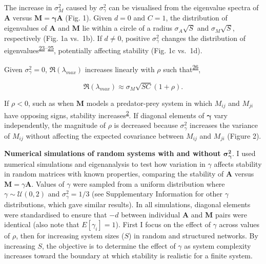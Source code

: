 \documentclass[]{article}
\begin{document}
The increase in \(\sigma^{2}_{M}\) caused by \(\sigma^{2}_\gamma\) can
be visualised from the eigenvalue spectra of \(\textbf{A}\) versus
\(\textbf{M} = \boldsymbol{\gamma}\textbf{A}\) (Fig. 1). Given \(d = 0\)
and \(C = 1\), the distribution of eigenvalues of \(\textbf{A}\) and
\(\textbf{M}\) lie within a circle of a radius \(\sigma_{A}\sqrt{S}\)
and \(\sigma_{M}\sqrt{S}\), respectively (Fig. 1a vs.~1b). If
\(d \neq 0\), positive \(\sigma^{2}_\gamma\) changes the distribution of
eigenvalues\textsuperscript{\protect\hyperlink{ref-Ahmadian2015}{23}--\protect\hyperlink{ref-Stone2017}{25}},
potentially affecting stability (Fig. 1c vs.~1d).

Given \(\sigma^{2}_\gamma = 0\), \(\Re(\lambda_{max})\) increases
linearly with \(\rho\) such
that\textsuperscript{\protect\hyperlink{ref-Tang2014c}{26}},

\begin{equation} 
\Re(\lambda_{max}) \approx \sigma_{M}\sqrt{SC}\left(1 + \rho\right). \nonumber
\end{equation}

If \(\rho < 0\), such as when \(\textbf{M}\) models a predator-prey
system in which \(M_{ij}\) and \(M_{ji}\) have opposing signs, stability
increases\textsuperscript{\protect\hyperlink{ref-Allesina2012}{2}}. If
diagonal elements of \(\boldsymbol{\gamma}\) vary independently, the
magnitude of \(\rho\) is decreased because \(\sigma^{2}_{\gamma}\)
increases the variance of \(M_{ij}\) without affecting the expected
covariance between \(M_{ij}\) and \(M_{ji}\) (Figure 2).

\textbf{Numerical simulations of random systems with and without
\(\mathbf{\sigma^{2}_{\gamma}}\)}. I used numerical simulations and
eigenanalysis to test how variation in \(\gamma\) affects stability in
random matrices with known properties, comparing the stability of
\(\textbf{A}\) versus \(\mathbf{M} = \gamma\mathbf{A}\). Values of
\(\gamma\) were sampled from a uniform distribution where
\(\gamma \sim \mathcal{U}(0, 2)\) and \(\sigma^{2}_{\gamma} = 1/3\) (see
Supplementary Information for other \(\gamma\) distributions, which gave
similar results). In all simulations, diagonal elements were
standardised to ensure that \(-d\) between individual \(\textbf{A}\) and
\(\textbf{M}\) pairs were identical (also note that
\(E[\gamma_{i}] = 1\)). First I focus on the effect of \(\gamma\) across
values of \(\rho\), then for increasing system sizes (\(S\)) in random
and structured networks. By increasing \(S\), the objective is to
determine the effect of \(\gamma\) as system complexity increases toward
the boundary at which stability is realistic for a finite system.
\end{document}
